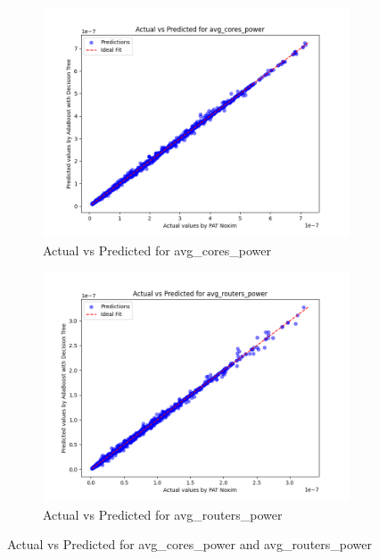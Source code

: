 \documentclass[conference]{IEEEtran}
\begin{document}
\begin{figure}[htbp]
    \begin{subfigure}{0.24\textwidth}
        \centering
        \includegraphics[width=\linewidth]{actual_vs_predicted_avg_cores_power.png}
        \caption{Actual vs Predicted for avg\_cores\_power}
        \label{fig:actual_vs_predicted_avg_cores_power}
    \end{subfigure}
    \hfill
    \begin{subfigure}{0.24\textwidth}
        \centering
        \includegraphics[width=\linewidth]{actual_vs_predicted_avg_routers_power.png}
        \caption{Actual vs Predicted for avg\_routers\_power}
        \label{fig:actual_vs_predicted_avg_routers_power}
    \end{subfigure}

    \caption{Actual vs Predicted for avg\_cores\_power and avg\_routers\_power}
    \label{fig:side_by_side_graphs_avg_cores_power_avg_routers_power}
\end{figure}
\end{document}
